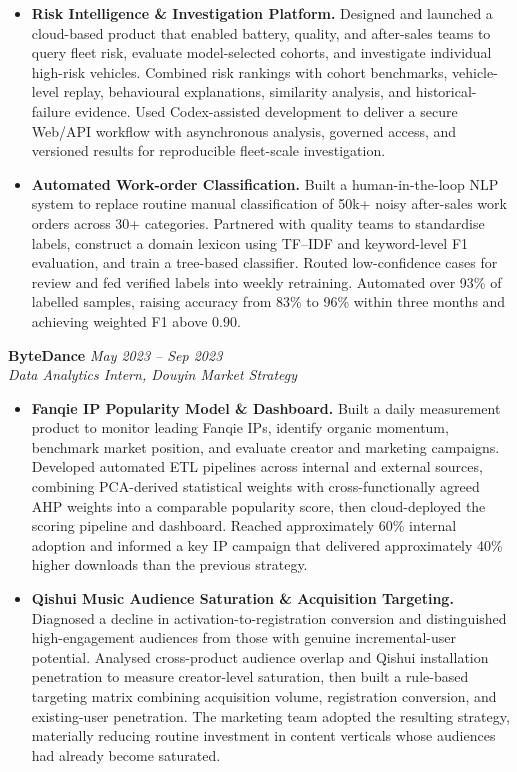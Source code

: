 \documentclass[a4paper,10pt]{article}
\begin{document}
\begin{itemize}
\item \textbf{Risk Intelligence \& Investigation Platform.} Designed and launched a cloud-based product that enabled battery, quality, and after-sales teams to query fleet risk, evaluate model-selected cohorts, and investigate individual high-risk vehicles. Combined risk rankings with cohort benchmarks, vehicle-level replay, behavioural explanations, similarity analysis, and historical-failure evidence. Used Codex-assisted development to deliver a secure Web/API workflow with asynchronous analysis, governed access, and versioned results for reproducible fleet-scale investigation.
\item \textbf{Automated Work-order Classification.} Built a human-in-the-loop NLP system to replace routine manual classification of 50k+ noisy after-sales work orders across 30+ categories. Partnered with quality teams to standardise labels, construct a domain lexicon using TF--IDF and keyword-level F1 evaluation, and train a tree-based classifier. Routed low-confidence cases for review and fed verified labels into weekly retraining. Automated over 93\% of labelled samples, raising accuracy from 83\% to 96\% within three months and achieving weighted F1 above 0.90.
\end{itemize}

\vspace{0.5pt}
\textbf{ByteDance} \hfill \textit{May 2023 -- Sep 2023}\\
\textit{Data Analytics Intern, Douyin Market Strategy}
\begin{itemize}
\item \textbf{Fanqie IP Popularity Model \& Dashboard.} Built a daily measurement product to monitor leading Fanqie IPs, identify organic momentum, benchmark market position, and evaluate creator and marketing campaigns. Developed automated ETL pipelines across internal and external sources, combining PCA-derived statistical weights with cross-functionally agreed AHP weights into a comparable popularity score, then cloud-deployed the scoring pipeline and dashboard. Reached approximately 60\% internal adoption and informed a key IP campaign that delivered approximately 40\% higher downloads than the previous strategy.
\item \textbf{Qishui Music Audience Saturation \& Acquisition Targeting.} Diagnosed a decline in activation-to-registration conversion and distinguished high-engagement audiences from those with genuine incremental-user potential. Analysed cross-product audience overlap and Qishui installation penetration to measure creator-level saturation, then built a rule-based targeting matrix combining acquisition volume, registration conversion, and existing-user penetration. The marketing team adopted the resulting strategy, materially reducing routine investment in content verticals whose audiences had already become saturated.
\end{itemize}
\end{document}
